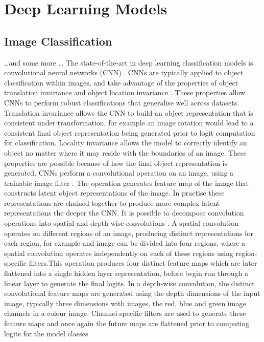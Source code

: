 
\chapter{Deep Learning Models}  %

\ifpdf
    \graphicspath{{Chapter1/Figs/Raster/}{Chapter1/Figs/PDF/}{Chapter1/Figs/}}
\else
    \graphicspath{{Chapter1/Figs/Vector/}{Chapter1/Figs/}}
\fi


\section{Image Classification}
\dots and some more \dots
The state-of-the-art in deep learning classification models is convolutional neural networks (CNN) \citet{reference}. CNNs are typically applied to object classification within images, and take advantage of the properties of object translation invariance and object location invariance \cite{reference}. These properties allow CNNs to perform robust classifications that generalise well across datasets. Translation invariance allows the CNN to build an object representation that is consistent under transformation, for example an image rotation would lead to a consistent final object representation being generated prior to logit computation for classification. Locality invariance allows the model to correctly identify an object no matter where it may reside with the boundaries of an image. \newline
These properties are possible because of how the final object representation is generated. CNNs perform a convolutional operation on an image, using a trainable image filter \cite{reference}. The operation generates feature map of the image that constructs latent object representations of the image. In practise these representations are chained together to produce more complex latent representations the deeper the CNN. \newline
It is possible to decompose convolution operations into spatial and depth-wise convolutions \cite{reference}. A spatial convolution operates on different regions of an image, producing distinct representations for each region, for example and image can be divided into four regions, where a spatial convolution operates independently on each of these regions using region-specific filters.This operation produces four distinct feature maps which are later flattened into a single hidden layer representation, before begin run through a linear layer to generate the final logits. In a depth-wise convolution, the distinct convolutional feature maps are generated using the depth dimensions of the input image, typically three dimensions with images, the red, blue and green image channels in a colour image. Channel-specific filters are used to generate these feature maps and once again the future maps are flattened prior to computing logits for the model classes. \newline
